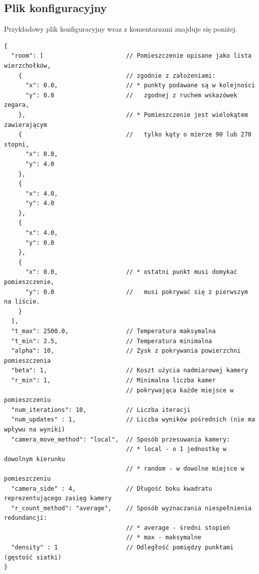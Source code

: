 \documentclass[12pt,a4paper]{article}
\begin{document}
\subsection{Plik konfiguracyjny}
Przykładowy plik konfiguracyjny wraz z komentarzami znajduje się poniżej.
{
\footnotesize
\begin{verbatim}
{
  "room": [                       // Pomieszczenie opisane jako lista wierzchołków,
    {                             // zgodnie z założeniami:
      "x": 0.0,                   // * punkty podawane są w kolejności 
      "y": 0.0                    //   zgodnej z ruchem wskazówek zegara,
    },                            // * Pomieszczenie jest wielokątem zawierającym
    {                             //   tylko kąty o mierze 90 lub 270 stopni,
      "x": 0.0,
      "y": 4.0
    },
    {
      "x": 4.0,
      "y": 4.0
    },
    {
      "x": 4.0,
      "y": 0.0
    },
    {              
      "x": 0.0,                   // * ostatni punkt musi domykać pomieszczenie,
      "y": 0.0                    //   musi pokrywać się z pierwszym na liście.
    }
  ],
  "t_max": 2500.0,                // Temperatura maksymalna
  "t_min": 2.5,                   // Temperatura minimalna
  "alpha": 10,                    // Zysk z pokrywania powierzchni pomieszczenia
  "beta": 1,                      // Koszt użycia nadmiarowej kamery
  "r_min": 1,                     // Minimalna liczba kamer 
                                  // pokrywająca każde miejsce w pomieszczeniu
  "num_iterations": 10,           // Liczba iteracji
  "num_updates" : 1,              // Liczba wyników pośrednich (nie ma wpływu na wyniki)
  "camera_move_method": "local",  // Sposób przesuwania kamery:
                                  // * local - o 1 jednostkę w dowolnym kierunku
                                  // * random - w dowolne miejsce w pomieszczeniu
  "camera_side" : 4,              // Długość boku kwadratu reprezentującego zasięg kamery
  "r_count_method": "average",    // Sposób wyznaczania niespełnienia redundancji:
                                  // * average - średni stopień
                                  // * max - maksymalne
  "density" : 1                   // Odległość pomiędzy punktami (gęstość siatki)
}
\end{verbatim}
}
\end{document}
